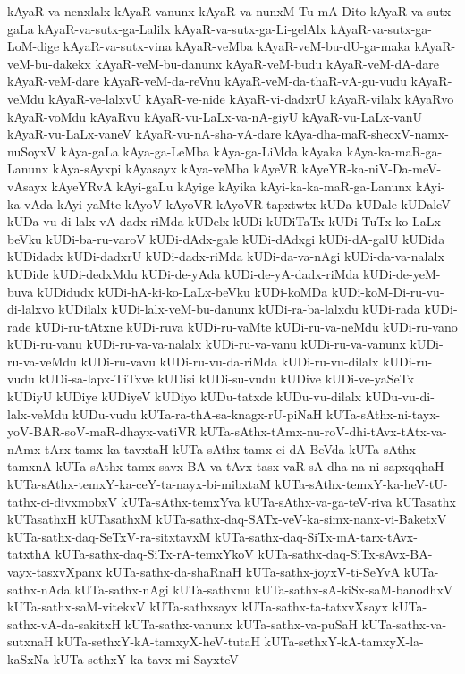 {kAyaR-va-nenxlalx
kAyaR-vanunx
kAyaR-va-nunxM-Tu-mA-Dito
kAyaR-va-sutx-gaLa
kAyaR-va-sutx-ga-Lalilx
kAyaR-va-sutx-ga-Li-gelAlx
kAyaR-va-sutx-ga-LoM-dige
kAyaR-va-sutx-vina
kAyaR-veMba
kAyaR-veM-bu-dU-ga-maka
kAyaR-veM-bu-dakekx
kAyaR-veM-bu-danunx
kAyaR-veM-budu
kAyaR-veM-dA-dare
kAyaR-veM-dare
kAyaR-veM-da-reVnu
kAyaR-veM-da-thaR-vA-gu-vudu
kAyaR-veMdu
kAyaR-ve-lalxvU
kAyaR-ve-nide
kAyaR-vi-dadxrU
kAyaR-vilalx
kAyaRvo
kAyaR-voMdu
kAyaRvu
kAyaR-vu-LaLx-va-nA-giyU
kAyaR-vu-LaLx-vanU
kAyaR-vu-LaLx-vaneV
kAyaR-vu-nA-sha-vA-dare
kAya-dha-maR-shecxV-namx-nuSoyxV
kAya-gaLa
kAya-ga-LeMba
kAya-ga-LiMda
kAyaka
kAya-ka-maR-ga-Lanunx
kAya-sAyxpi
kAyasayx
kAya-veMba
kAyeVR
kAyeYR-ka-niV-Da-meV-vAsayx
kAyeYRvA
kAyi-gaLu
kAyige
kAyika
kAyi-ka-ka-maR-ga-Lanunx
kAyi-ka-vAda
kAyi-yaMte
kAyoV
kAyoVR
kAyoVR-tapxtwtx
kUDa
kUDale
kUDaleV
kUDa-vu-di-lalx-vA-dadx-riMda
kUDelx
kUDi
kUDiTaTx
kUDi-TuTx-ko-LaLx-beVku
kUDi-ba-ru-varoV
kUDi-dAdx-gale
kUDi-dAdxgi
kUDi-dA-galU
kUDida
kUDidadx
kUDi-dadxrU
kUDi-dadx-riMda
kUDi-da-va-nAgi
kUDi-da-va-nalalx
kUDide
kUDi-dedxMdu
kUDi-de-yAda
kUDi-de-yA-dadx-riMda
kUDi-de-yeM-buva
kUDidudx
kUDi-hA-ki-ko-LaLx-beVku
kUDi-koMDa
kUDi-koM-Di-ru-vu-di-lalxvo
kUDilalx
kUDi-lalx-veM-bu-danunx
kUDi-ra-ba-lalxdu
kUDi-rada
kUDi-rade
kUDi-ru-tAtxne
kUDi-ruva
kUDi-ru-vaMte
kUDi-ru-va-neMdu
kUDi-ru-vano
kUDi-ru-vanu
kUDi-ru-va-va-nalalx
kUDi-ru-va-vanu
kUDi-ru-va-vanunx
kUDi-ru-va-veMdu
kUDi-ru-vavu
kUDi-ru-vu-da-riMda
kUDi-ru-vu-dilalx
kUDi-ru-vudu
kUDi-sa-lapx-TiTxve
kUDisi
kUDi-su-vudu
kUDive
kUDi-ve-yaSeTx
kUDiyU
kUDiye
kUDiyeV
kUDiyo
kUDu-tatxde
kUDu-vu-dilalx
kUDu-vu-di-lalx-veMdu
kUDu-vudu
kUTa-ra-thA-sa-knagx-rU-piNaH
kUTa-sAthx-ni-tayx-yoV-BAR-soV-maR-dhayx-vatiVR
kUTa-sAthx-tAmx-nu-roV-dhi-tAvx-tAtx-va-nAmx-tArx-tamx-ka-tavxtaH
kUTa-sAthx-tamx-ci-dA-BeVda
kUTa-sAthx-tamxnA
kUTa-sAthx-tamx-savx-BA-va-tAvx-tasx-vaR-sA-dha-na-ni-sapxqqhaH
kUTa-sAthx-temxY-ka-ceY-ta-nayx-bi-mibxtaM
kUTa-sAthx-temxY-ka-heV-tU-tathx-ci-divxmobxV
kUTa-sAthx-temxYva
kUTa-sAthx-va-ga-teV-riva
kUTasathx
kUTasathxH
kUTasathxM
kUTa-sathx-daq-SATx-veV-ka-simx-nanx-vi-BaketxV
kUTa-sathx-daq-SeTxV-ra-sitxtavxM
kUTa-sathx-daq-SiTx-mA-tarx-tAvx-tatxthA
kUTa-sathx-daq-SiTx-rA-temxYkoV
kUTa-sathx-daq-SiTx-sAvx-BA-vayx-tasxvXpanx
kUTa-sathx-da-shaRnaH
kUTa-sathx-joyxV-ti-SeYvA
kUTa-sathx-nAda
kUTa-sathx-nAgi
kUTa-sathxnu
kUTa-sathx-sA-kiSx-saM-banodhxV
kUTa-sathx-saM-vitekxV
kUTa-sathxsayx
kUTa-sathx-ta-tatxvXsayx
kUTa-sathx-vA-da-sakitxH
kUTa-sathx-vanunx
kUTa-sathx-va-puSaH
kUTa-sathx-va-sutxnaH
kUTa-sethxY-kA-tamxyX-heV-tutaH
kUTa-sethxY-kA-tamxyX-la-kaSxNa
kUTa-sethxY-ka-tavx-mi-SayxteV
}
